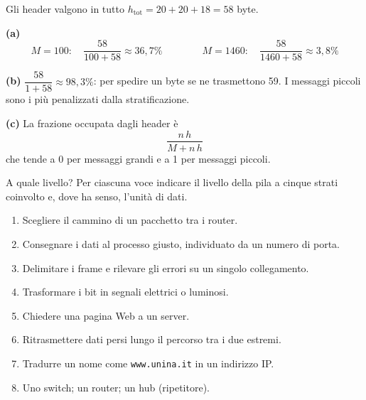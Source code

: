 \svolgimento
Gli header valgono in tutto $h_{\text{tot}} = 20 + 20 + 18 = 58$ byte.

\begin{center}
\end{center}

\textbf{(a)}
$$M = 100: \quad \frac{58}{100 + 58} \approx 36{,}7\% \qquad\qquad M = 1460: \quad \frac{58}{1460 + 58} \approx 3{,}8\%$$

\textbf{(b)} $\dfrac{58}{1 + 58} \approx 98{,}3\%$: per spedire un byte se ne trasmettono 59. I messaggi piccoli sono i più
penalizzati dalla stratificazione.

\textbf{(c)} La frazione occupata dagli header è
$$\frac{n\,h}{M + n\,h}$$
che tende a 0 per messaggi grandi e a 1 per messaggi piccoli.

\begin{esercizio}{A quale livello?}
Per ciascuna voce indicare il livello della pila a cinque strati coinvolto e, dove ha senso, l'unità di dati.
\begin{enumerate}
    \item Scegliere il cammino di un pacchetto tra i router.
    \item Consegnare i dati al processo giusto, individuato da un numero di porta.
    \item Delimitare i frame e rilevare gli errori su un singolo collegamento.
    \item Trasformare i bit in segnali elettrici o luminosi.
    \item Chiedere una pagina Web a un server.
    \item Ritrasmettere dati persi lungo il percorso tra i due estremi.
    \item Tradurre un nome come \texttt{www.unina.it} in un indirizzo IP.
    \item Uno switch; un router; un hub (ripetitore).
\end{enumerate}
\end{esercizio}

